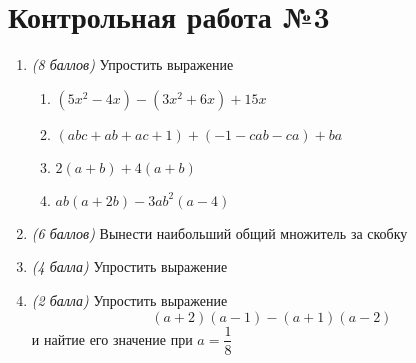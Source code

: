 \documentclass[12pt, a4paper]{article}
\begin{document}
\section*{Контрольная работа №3}
\begin{enumerate}
	\item \textit{(8 баллов)} Упростить выражение
	\begin{enumerate}[label=\asbuk*)]
			\item $(5x^2-4x)-(3x^2+6x)+15x$
			\item $(abc+ab+ac+1)+(-1-cab-ca)+ba$
			\item $2(a+b)+4(a+b)$
			\item $ab(a+2b)-3ab^2(a-4)$
	\end{enumerate}
	\item \textit{(6 баллов)} Вынести наибольший общий множитель за скобку
	\begin{enumerate}[label=\asbuk*)]
	\end{enumerate}
	\item \textit{(4 балла)} Упростить выражение
	\begin{enumerate}[label=\asbuk*)]
	\end{enumerate}
	\item \textit{(2 балла)} Упростить выражение $$(a+2)(a-1)-(a+1)(a-2)$$ и найтие его значение при $a=\dfrac{1}{8}$
\end{enumerate}
\end{document}
